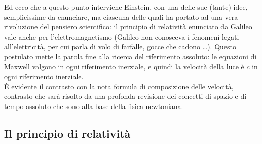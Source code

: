 Ed ecco che a questo punto interviene Einstein, con una delle sue (tante) idee,
semplicissime da enunciare, ma ciascuna delle quali ha portato ad una vera
rivoluzione del pensiero scientifico: il principio di relativit\`a enunciato da
Galileo vale anche per l'elettromagnetismo (Galileo non conosceva i fenomeni
legati all'elettricit\`a, per cui parla di volo di farfalle, gocce che cadono
\dots). Questo postulato mette la parola fine alla ricerca del riferimento
assoluto: le equazioni di Maxwell valgono in ogni riferimento inerziale, e
quindi la velocit\`a della luce \`e $c$ in ogni riferimento inerziale.\\
\`E evidente il contrasto con la nota formula di composizione delle velocit\`a,
contrasto che sar\`a risolto da una profonda revisione dei concetti di spazio e
di tempo assoluto che sono alla base della fisica newtoniana.

\subsection{Il principio di relativit\`a}

